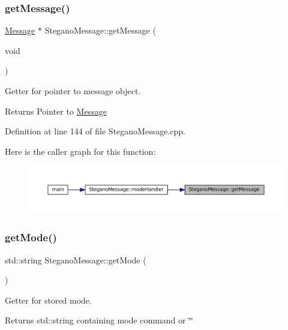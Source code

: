 \subsubsection{\texorpdfstring{getMessage()}{getMessage()}}
{\footnotesize\ttfamily \mbox{\hyperlink{classMessage}{Message}} $\ast$ Stegano\+Message\+::get\+Message (\begin{DoxyParamCaption}\item[{void}]{ }\end{DoxyParamCaption})}



Getter for pointer to message object. 

\begin{DoxyReturn}{Returns}
Pointer to \mbox{\hyperlink{classMessage}{Message}} 
\end{DoxyReturn}


Definition at line 144 of file Stegano\+Message.\+cpp.

Here is the caller graph for this function\+:\nopagebreak
\begin{figure}[H]
\begin{center}
\leavevmode
\includegraphics[width=350pt]{classSteganoMessage_ad29978e925056ad70dc5c45b1e1681eb_icgraph}
\end{center}
\end{figure}
\mbox{\label{classSteganoMessage_a7dc660e6d2c8f162636f789cfedde67e}} 
\subsubsection{\texorpdfstring{getMode()}{getMode()}}
{\footnotesize\ttfamily std\+::string Stegano\+Message\+::get\+Mode (\begin{DoxyParamCaption}{ }\end{DoxyParamCaption})}



Getter for stored mode. 

\begin{DoxyReturn}{Returns}
std\+::string containing mode command or \char`\"{}\char`\"{} 
\end{DoxyReturn}


